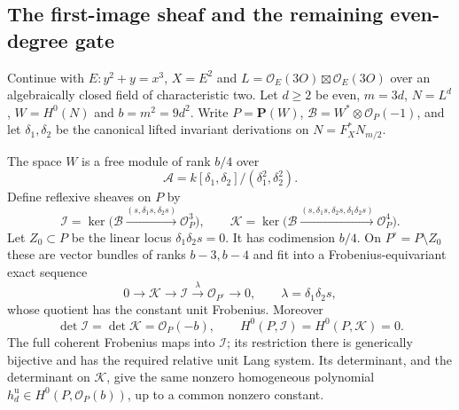 \subsection{The first-image sheaf and the remaining even-degree gate}
\label{subsec:ss-even-image-sheaf}

Continue with $E:y^2+y=x^3$, $X=E^2$ and
$L=\mathcal O_E(3O)\boxtimes\mathcal O_E(3O)$ over an
algebraically closed field of characteristic two. Let $d\ge2$ be
even, $m=3d$, $N=L^d$, $W=H^0(N)$ and $b=m^2=9d^2$.
Write $P=\mathbf P(W)$, $\mathcal B=W^*\otimes\mathcal O_P(-1)$,
and let $\delta_1,\delta_2$ be the canonical lifted invariant
derivations on $N=F_X^*N_{m/2}$.

\begin{lemma}
\label{lem:ss-even-image-sheaf}
The space $W$ is a free module of rank $b/4$ over
\[
 \mathcal A=k[\delta_1,\delta_2]/(\delta_1^2,\delta_2^2).
\]
Define reflexive sheaves on $P$ by
\[
 \mathcal I=\ker\bigl(\mathcal B\xrightarrow{(s,\delta_1s,\delta_2s)}
                                  \mathcal O_P^3\bigr),\qquad
 \mathcal K=\ker\bigl(\mathcal B\xrightarrow{
 (s,\delta_1s,\delta_2s,\delta_1\delta_2s)}\mathcal O_P^4\bigr).
\]
Let $Z_0\subset P$ be the linear locus $\delta_1\delta_2s=0$.
It has codimension $b/4$. On $P^\circ=P\setminus Z_0$ these are
vector bundles of ranks $b-3,b-4$ and fit into a Frobenius-equivariant
exact sequence
\[
 0\longrightarrow\mathcal K\longrightarrow\mathcal I
        \xrightarrow{\lambda}\mathcal O_{P^\circ}\longrightarrow0,
 \qquad \lambda=\delta_1\delta_2s,
\]
whose quotient has the constant unit Frobenius. Moreover
\[
 \det\mathcal I=\det\mathcal K=\mathcal O_P(-b),\qquad
 H^0(P,\mathcal I)=H^0(P,\mathcal K)=0.
\]
The full coherent Frobenius maps into $\mathcal I$; its restriction
there is generically bijective and has the required relative unit
Lang system. Its determinant, and the determinant on $\mathcal K$,
give the same nonzero homogeneous polynomial
$h_d^{\mathrm u}\in H^0(P,\mathcal O_P(b))$, up to a common
nonzero constant.
\end{lemma}

